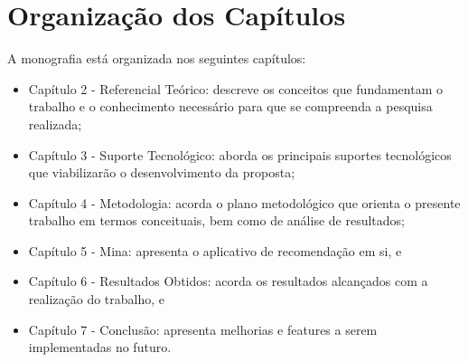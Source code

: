 \section{Organização dos Capítulos}

A monografia está organizada nos seguintes capítulos:

\begin{itemize}


        \item Capítulo 2 - Referencial Teórico: descreve os conceitos que fundamentam o trabalho e o conhecimento necessário para que se compreenda a pesquisa realizada;
        
        \item Capítulo 3 - Suporte Tecnológico: aborda os principais suportes tecnológicos que viabilizarão o desenvolvimento da proposta;
        
        \item Capítulo 4 - Metodologia: acorda o plano metodológico que orienta o presente trabalho em termos conceituais, bem como de análise de resultados;

        \item Capítulo 5 - Mina: apresenta o aplicativo de recomendação em si, e

        \item Capítulo 6 - Resultados Obtidos: acorda os resultados alcançados com a realização do trabalho, e
        
        \item Capítulo 7 - Conclusão: apresenta melhorias e features a serem implementadas
        no futuro.

\end{itemize}